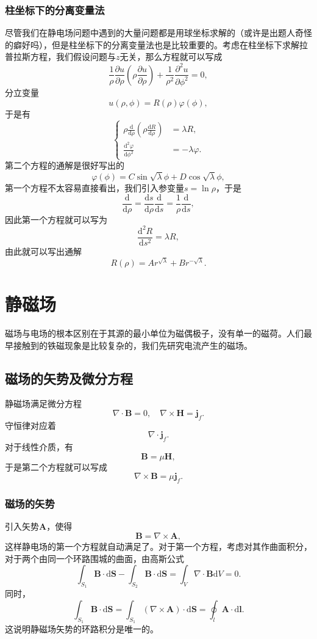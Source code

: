 \documentclass[UTF8]{ctexbook}
\renewcommand{\d}{\mathrm{d}}
\renewcommand{\b}{\boldsymbol}
\numberwithin{equation}{chapter}
\begin{document}
	\subsection{柱坐标下的分离变量法}
	尽管我们在静电场问题中遇到的大量问题都是用球坐标求解的（或许是出题人奇怪的癖好吗），但是柱坐标下的分离变量法也是比较重要的。考虑在柱坐标下求解拉普拉斯方程，我们假设问题与$z$无关，那么方程就可以写成
	\[\frac{1}{\rho}\frac{\partial u}{\partial \rho}\left(\rho\frac{\partial u}{\partial \rho}\right)+\frac{1}{\rho^2}\frac{\partial^2 u}{\partial \phi^2}=0,\]
	分立变量
	\[u(\rho,\phi)=R(\rho)\varphi(\phi),\]
	于是有
	\[\left\{\begin{aligned}
		\rho\frac{\d }{\d \rho}\left(\rho\frac{\d R}{\d \rho}\right)&=\lambda R, \\
		\frac{\d^2\varphi}{\d \phi^2}&=-\lambda\varphi.
	\end{aligned}\right.\]
	第二个方程的通解是很好写出的
	\[\varphi(\phi)=C\sin\sqrt{\lambda}\phi+D\cos\sqrt{\lambda}\phi,\]
	第一个方程不太容易直接看出，我们引入参变量$s=\ln \rho$，于是
	\[\frac{\d }{\d \rho}=\frac{\d s}{\d \rho}\frac{\d }{\d s}=\frac{1}{\rho}\frac{\d }{\d s},\]
	因此第一个方程就可以写为
	\[\frac{\d^2  R}{\d s^2}=\lambda R, \]
	由此就可以写出通解
	\[R(\rho)=Ar^{\sqrt{\lambda}}+Br^{-\sqrt{\lambda}}.\]
	
	\chapter{静磁场}
	磁场与电场的根本区别在于其源的最小单位为磁偶极子，没有单一的磁荷。人们最早接触到的铁磁现象是比较复杂的，我们先研究电流产生的磁场。
	\section{磁场的矢势及微分方程}
	静磁场满足微分方程
	\[\nabla\cdot\b{B}=0,\quad \nabla\times\b{H}=\b{j}_f.\]
	守恒律对应着
	\[\nabla\cdot\b{j}_f.\]
	对于线性介质，有
	\[\b{B}=\mu \b{H},\]
	于是第二个方程就可以写成
	\[\nabla\times\b{B}=\mu\b{j}_f.\]
	\subsection{磁场的矢势}
	引入矢势$\b{A}$，使得
	\[\b{B}=\nabla\times\b{A},\]
	这样静电场的第一个方程就自动满足了。对于第一个方程，考虑对其作曲面积分，对于两个由同一个环路围城的曲面，由高斯公式
	\[\int_{S_1}\b{B}\cdot\d \b{S}-\int_{S_2}\b{B}\cdot\d\b{S}=\int_V \nabla\cdot\b{B}\d V=0.\]
	同时，
	\[\int_{S_1}\b{B}\cdot\d\b{S}=\int_{S_1}(\nabla\times\b{A})\cdot\d\b{S}=\oint_{l}\b{A}\cdot\d\b{l}.\]
	这说明静磁场矢势的环路积分是唯一的。
	
\end{document}
